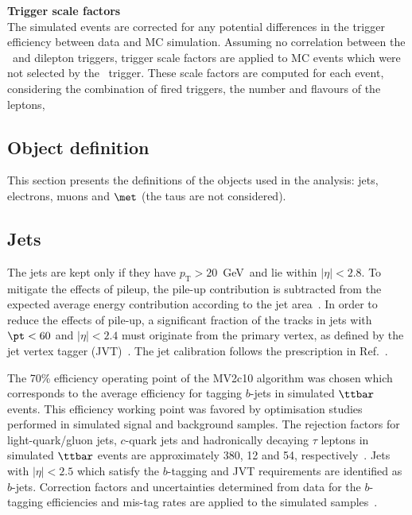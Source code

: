 \par{\bfseries Trigger scale factors\\}
The simulated events are corrected for any potential differences in 
the trigger efficiency between data and MC simulation.
Assuming no correlation between the \met\ and dilepton triggers, 
trigger scale factors are applied to MC events which were not selected 
by the \met\ trigger.
These scale factors are computed for each event, considering the combination of fired triggers, the number and flavours of the leptons, 

\subsection{Object definition}
\label{subsec:strategy.sel.obj}

This section presents the definitions of the objects used in the analysis: 
jets, electrons, muons and $\met$ (the taus are not considered).

\subsection*{Jets}
\label{subsec:sec.strategy.sel.objects_jets}



The jets are kept only if they have $p_\mathrm{T}>20$~GeV~and lie 
within $|\eta|<2.8$. 
To mitigate the effects of pileup, the pile-up contribution is subtracted 
from the expected average energy contribution according to the jet area~\cite{Cacciari:2007fd,Aaboud:2017jcu}.
In order to reduce the effects of pile-up, 
a significant fraction of the tracks in jets with $\pt<60$ \GeV and $|\eta|<2.4$ must originate from the primary vertex, 
as defined by the jet vertex tagger (JVT)~\cite{ATLAS-CONF-2014-018}. 
The jet calibration follows the prescription in Ref.~\cite{Aaboud:2017jcu}.

 
The 70\% efficiency operating point of the MV2c10 algorithm  was chosen which 
corresponds to the
average efficiency for tagging $b$-jets in simulated $\ttbar$ events. 
This efficiency working point was favored by optimisation studies performed in 
simulated signal and background samples.
The rejection factors for light-quark/gluon jets, $c$-quark jets and hadronically decaying $\tau$ leptons in simulated $\ttbar$ events 
are approximately 380, 12 and 54, respectively~\cite{ATL-PHYS-PUB-2015-022,ATL-PHYS-PUB-2016-012}. 
Jets with $|\eta|<2.5$ which satisfy the $b$-tagging and JVT requirements are identified as $b$-jets. 
Correction factors and uncertainties determined from data for the $b$-tagging efficiencies and mis-tag rates
are applied to the simulated samples~\cite{ATL-PHYS-PUB-2015-022}. 


